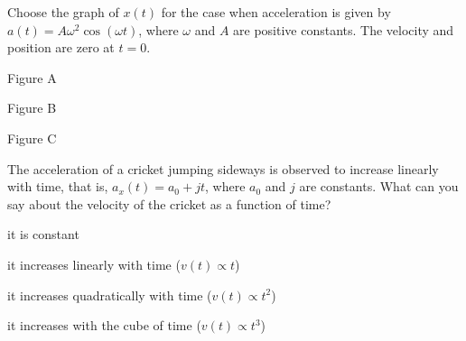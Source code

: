 \begin{checkpoint}
\begin{MCquestion}{Choose the graph of $x(t)$ for the case when acceleration is given by $a(t)=A\omega^2\cos(\omega t)$, where $\omega$ and $A$ are positive constants. The velocity and position are zero at $t=0$.
}
\item Figure A \correct
\item Figure B
\item Figure C 
\end{MCquestion}
\end{checkpoint}

\begin{checkpoint}
\begin{MCquestion}{The acceleration of a cricket jumping sideways is observed to increase linearly with time, that is, $a_x(t)=a_0+jt$, where $a_0$ and $j$ are constants. What can you say about the velocity of the cricket as a function of time?}
\item it is constant
\item it increases linearly with time ($v(t)\propto t$)
\item it increases quadratically with time ($v(t)\propto t^2$) \correct
\item it increases with the cube of time ($v(t)\propto t^3$)
\end{MCquestion}
\end{checkpoint}





